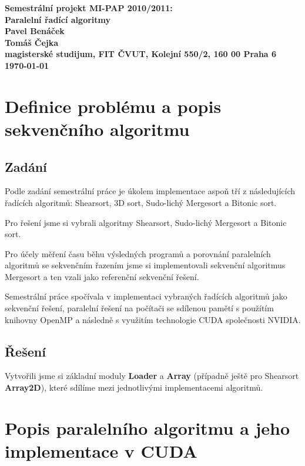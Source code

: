 \documentclass[12pt]{article}
\begin{document}

\begin{center}
\bf Semestrální projekt MI-PAP 2010/2011:\\[5mm]
    Paralelní řadící algoritmy\\[5mm]
    Pavel Benáček\\   
    Tomáš Čejka\\[2mm]
magisterské studijum, FIT ČVUT, Kolejní 550/2, 160 00 Praha 6\\[2mm]
\today
\end{center}
\newpage

\tableofcontents
\listoftables
\newpage
\section{Definice problému a popis sekvenčního algoritmu}
\subsection{Zadání}
Podle zadání semestrální práce je úkolem implementace aspoň tří z následujících
řadících algoritmů: Shearsort, 3D sort, Sudo-lichý Mergesort a Bitonic sort.

Pro řešení jsme si vybrali algoritmy Shearsort, Sudo-lichý Mergesort a Bitonic sort.

Pro účely měření času běhu výsledných programů a porovnání paralelních algoritmů se sekvenčním
řazením jsme si implementovali sekvenční algoritmus Mergesort a ten vzali jako referenční sekvenční
řešení.

Semestrální práce spočívala v implementaci vybraných řadících algoritmů jako sekvenční řešení, paralelní
řešení na počítači se sdílenou pamětí s použítím knihovny OpenMP a následně s využitím technologie CUDA
společnosti NVIDIA\textsuperscript{\tiny{\textregistered}}.

\subsection{Řešení}
Vytvořili jsme si základní moduly \textbf{Loader} a \textbf{Array} (případně ještě pro Shearsort 
\textbf{Array2D}), které sdílíme mezi jednotlivými implementacemi algoritmů.
\section{Popis paralelního algoritmu a jeho implementace v CUDA}
\end{document}

